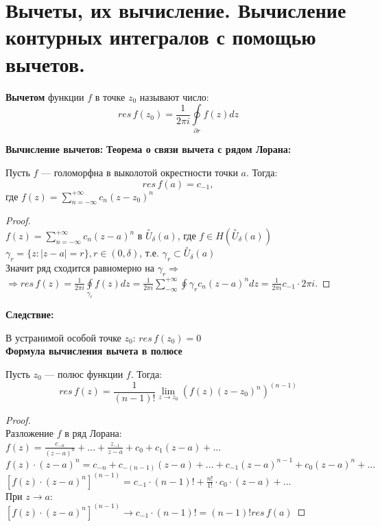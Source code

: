 \newpage
\section{Вычеты, их вычисление. Вычисление контурных интегралов с помощью вычетов.}

\textbf{Вычетом} функции $f$ в точке $z_0$ называют число:
$$res\, f(z_0) = \frac{1}{2\pi i} \oint\limits_{\partial r}f(z)dz$$

\textbf{Вычисление вычетов:}
\textbf{Теорема о связи вычета с рядом Лорана:}

Пусть $f$ --- голоморфна в выколотой окрестности точки $a$. Тогда:
$$
res\, f(a) = c_{-1},
$$
где $f(z) = \sum_{n=-\infty}^{+\infty}c_n (z-z_0)^n$
\\

\begin{proof}
    \ \\
    $f(z)=\sum_{n=-\infty}^{+\infty}c_n(z-a)^n$ в $\overset{\circ}{U}_{\delta}(a)$, где $f\in H(\overset{\circ}{U}_{\delta}(a))$\\
    $\gamma_r=\{z: |z-a|=r\}, r\in (0, \delta)$, т.е. $\gamma_r \subset \overset{\circ}{U}_{\delta}(a)$\\
    Значит ряд сходится равномерно на $\gamma_r \Rightarrow $\\
    $\Rightarrow res\,f(z)=\frac{1}{2\pi i}\oint\limits_{\gamma_r}f(z)dz=\frac{1}{2\pi i}\sum_{-\infty}^{+\infty}\oint\limits{\gamma_r} c_n(z-a)^ndz=\frac{1}{2\pi i}c_{-1}\cdot 2\pi i$.
\end{proof}


\textbf{Следствие:}

В устранимой особой точке $z_0$: $res\, f(z_0) = 0$
\\

\textbf{Формула вычисления вычета в полюсе}

Пусть $z_0$ --- полюс функции $f$. Тогда:
$$
res\, f(z) = \frac{1}{(n-1)!} \underset{z \rightarrow z_0}{\lim} \left(f(z)(z-z_0)^n\right)^{(n-1)}
$$

\begin{proof}
    \ \\
    Разложение $f$ в ряд Лорана:\\
    $f(z)=\frac{c_{-n}}{(z-a)^n}+...+\frac{z_{-1}}{z-a}+c_0+c_1(z-a)+...$\\
    $f(z)\cdot (z-a)^n=c_{-n}+c_{-(n-1)}(z-a)+...+c_{-1}(z-a)^{n-1}+c_0(z-a)^n+...$\\
    $\left[f(z)\cdot (z-a)^n\right]^{(n-1)}=c_{-1}\cdot (n-1)!+\frac{n!}{1!}\cdot c_0\cdot (z-a)+...$\\
    При  $z\to a: $\\
    $\left[f(z)\cdot (z-a)^n\right]^{(n-1)}\rightarrow c_{-1}\cdot (n-1)! = (n-1)!res\,f(a)$
\end{proof}

